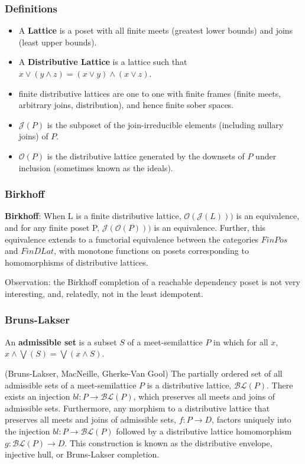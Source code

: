 \documentclass{beamer}
\newcommand{\Oc}{\mathcal{O}}
\newcommand{\Jc}{\mathcal{J}}
\newcommand{\BLc}{\mathcal{BL}}
\begin{document}
\begin{frame}
\frametitle{Definitions}
\begin{itemize}
\item A \textbf{Lattice} is a poset with all finite meets (greatest lower bounds) and joins (least upper bounds).

\item A \textbf{Distributive Lattice} is a lattice such that \(x \vee (y \wedge z) = (x \vee y) \wedge (x \vee z)\). 

\item finite distributive lattices are one to one with finite frames (finite meets, arbitrary joins, distribution), and hence finite sober spaces.

\item \textbf{\(\Jc(P)\)} is the subposet of the join-irreducible elements (including nullary joins) of \(P\).

\item \textbf{\(\Oc(P)\)} is the distributive lattice generated by the downsets of \(P\) under inclusion (sometimes known as the ideals).
\end{itemize}
\end{frame}	

\begin{frame}
\frametitle{Birkhoff}
\begin{theorem}
\textbf{Birkhoff}: When L is a finite distributive lattice, \(\Oc(\Jc(L)))\) is an equivalence, and for any finite poset P,  \(\Jc(\Oc(P)))\) is an equivalence. Further, this equivalence extends to a functorial equivalence between the categories \(FinPos\) and \(FinDLat\), with monotone functions on posets corresponding to homomorphisms of distributive lattices.
\end{theorem}

Observation: the Birkhoff completion of a reachable dependency poset is not very interesting, and, relatedly, not in the least idempotent.
\end{frame}


\begin{frame}
\frametitle{Bruns-Lakser}
An \textbf{admissible set} is a subset \(S\) of a meet-semilattice \(P\) in which for all \(x\), \(x \wedge \bigvee(S) = \bigvee(x \wedge S)\).

\begin{theorem}
(Bruns-Lakser, MacNeille, Gherke-Van Gool) The partially ordered set of all admissible sets of a meet-semilattice \(P\) is a distributive lattice, \(\BLc(P)\). There exists an injection \(bl : P \rightarrow \BLc(P)\), which preserves all meets and joins of admissible sets. Furthermore, any morphism to a distributive lattice that preserves all meets and joins of admissible sets, \(f : P \rightarrow D\), factors uniquely into the injection \(bl : P \rightarrow \BLc(P)\) followed by a distributive lattice homomorphism \(g : \BLc(P) \rightarrow D\). This construction is known as the distributive envelope, injective hull, or Bruns-Lakser completion.
\end{theorem}
\end{frame}
\end{document}
